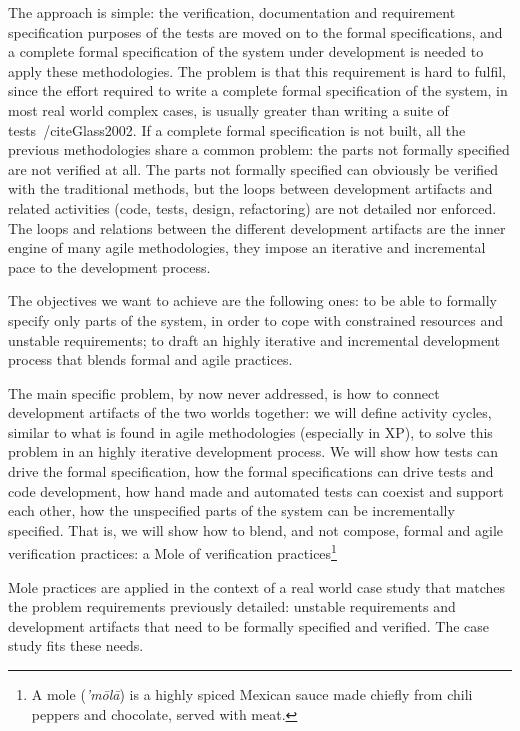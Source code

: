 \documentclass[english]{lni}
\begin{document}
The approach is simple: the verification, documentation and requirement specification purposes of the tests are moved on to the formal specifications, and a complete formal specification of the system under development is needed to apply these methodologies.
The problem is that this requirement is hard to fulfil, since the effort required to write a complete formal specification of the system, in most real world complex cases, is usually greater than writing a suite of tests~/cite{Glass2002}.
If a complete formal specification is not built, all the previous methodologies share a common problem: the parts not formally specified are not verified at all.
The parts not formally specified can obviously be verified with the traditional methods, but the loops between development artifacts and related activities (code, tests, design, refactoring) are not detailed nor enforced.
The loops and relations between the different development artifacts are the inner engine of many agile methodologies, they impose an iterative and incremental pace to the development process.

The objectives we want to achieve are the following ones: to be able to formally specify only parts of the system, in order to cope with constrained resources and unstable requirements; to draft an highly iterative and incremental development process that blends formal and agile practices.

The main specific problem, by now never addressed, is how to connect development artifacts of the two worlds together: we will define activity cycles, similar to what is found in agile methodologies (especially in XP), to solve this problem in an highly iterative development process.
We will show how tests can drive the formal specification, how the formal specifications can drive tests and code development, how hand made and automated tests can coexist and support each other, how the unspecified parts of the system can be incrementally specified.
That is, we will show how to blend, and not compose, formal and agile verification practices: a Mole of verification practices\footnote{A mole (\emph{'m\=ol\=a}) is a highly spiced Mexican sauce made chiefly from chili peppers and chocolate, served with meat.}

Mole practices are applied in the context of a real world case study that matches the problem requirements previously detailed: unstable requirements and development artifacts that need to be formally specified and verified.
The case study fits these needs.
\end{document}
